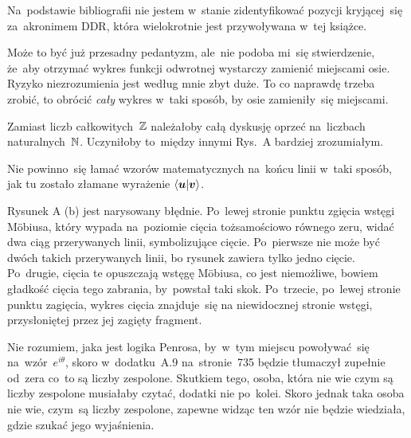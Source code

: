 \documentclass[a4paper,11pt]{article}
\begin{document}
\start {} Na~podstawie bibliografii nie jestem w~stanie
zidentyfikować pozycji kryjącej~się za~akronimem DDR, która
wielokrotnie jest przywoływana w~tej książce.

\vspace{\spaceFour}


\start {} Może to być już przesadny pedantyzm, ale~nie podoba
mi~się stwierdzenie, że~aby otrzymać wykres funkcji odwrotnej
wystarczy zamienić miejscami osie. Ryzyko niezrozumienia jest według
mnie zbyt duże. To co naprawdę trzeba zrobić, to obrócić \emph{cały}
wykres w~taki sposób, by osie zamieniły~się miejscami.

\vspace{\spaceFour}


\start {} Zamiast liczb całkowitych~$\mathbb{Z}$ należałoby całą
dyskusję oprzeć na~liczbach naturalnych~$\mathbb{N}$. Uczyniłoby to~między
innymi Rys.~A bardziej zrozumiałym.

\vspace{\spaceFour}


\start {} Nie powinno~się łamać wzorów matematycznych
na~końcu linii w~taki sposób, jak tu zostało złamane wyrażenie
$\langle  \boldsymbol{u}  |  \boldsymbol{v}  \rangle$.

\vspace{\spaceFour}


\start {} Rysunek A (b) jest narysowany błędnie.
Po~lewej stronie punktu zgięcia wstęgi M\"{o}biusa, który wypada
na~poziomie cięcia tożsamościowo równego zeru, widać dwa ciąg
przerywanych linii, symbolizujące cięcie. Po~pierwsze nie może być
dwóch takich przerywanych linii, bo rysunek zawiera tylko jedno
cięcie. Po~drugie, cięcia te opuszczają wstęgę M\"{o}biusa, co jest
niemożliwe, bowiem gładkość cięcia tego zabrania, by~powstał taki
skok. Po~trzecie, po~lewej stronie punktu zagięcia, wykres cięcia
znajduje~się na niewidocznej stronie wstęgi, przysłoniętej przez jej
zagięty fragment.

\vspace{\spaceFour}


\start {} Nie rozumiem, jaka jest logika Penrosa, by~w~tym
miejscu powoływać~się na~wzór~$e^{ i \theta }$, skoro w~dodatku~A.9
na~stronie~735 będzie tłumaczył zupełnie od~zera co~to są liczby
zespolone. Skutkiem tego, osoba, która nie wie czym są liczby
zespolone musiałaby czytać, dodatki nie po~kolei. Skoro jednak taka
osoba nie wie, czym~są liczby zespolone, zapewne widząc ten wzór nie
będzie wiedziała, gdzie szukać jego wyjaśnienia.
\end{document}
